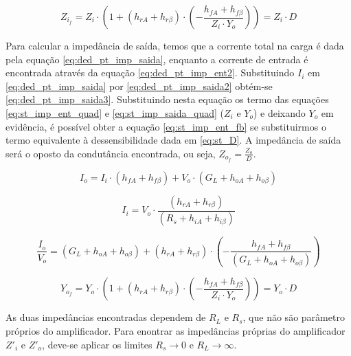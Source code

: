 \documentclass[openright]{normas-utf-tex} %
\begin{document}
\begin{equation}\label{eq:st_imp_ent_fb}
Z_{i_f} = Z_i \cdot \left( 1 + \left(h_{rA} + h_{r\beta}\right) \cdot \left(-\frac{h_{fA} + h_{f\beta}} {Z_i \cdot Y_o} \right) \right) = Z_i \cdot D
\end{equation}

Para calcular a impedância de saída, temos que a corrente total na carga é dada pela equação \ref{eq:ded_pt_imp_saida}, enquanto a corrente de entrada é encontrada através da equação \ref{eq:ded_pt_imp_ent2}. Substituindo $I_i$ em \ref{eq:ded_pt_imp_saida} por \ref{eq:ded_pt_imp_saida2} obtém-se \ref{eq:ded_pt_imp_saida3}. Substituindo nesta equação os termo das equações \ref{eq:st_imp_ent_quad} e \ref{eq:st_imp_saida_quad} ($Z_i$ e $Y_o$) e deixando $Y_o$ em evidência, é possível obter a equação \ref{eq:st_imp_ent_fb} se substituirmos o termo equivalente à dessensibilidade dada em \ref{eq:st_D}. A impedância de saída será o oposto da condutância encontrada, ou seja, $Z_{o_f} = \frac{Z_o}{D}$. \cite{pedroni,millman}

\begin{equation}\label{eq:ded_pt_imp_saida}
I_{o} = I_i \cdot \left( h_{fA} + h_{f\beta} \right) + V_o \cdot \left(G_L + h_{oA} + h_{o\beta} \right)
\end{equation}

\begin{equation}\label{eq:ded_pt_imp_saida2}
I_{i} =  V_o \cdot \frac{\left(h_{rA} + h_{r\beta}\right)}{\left( R_s + h_{iA} + h_{i\beta} \right)}
\end{equation}

\begin{equation}\label{eq:ded_pt_imp_saida3}
\frac{I_o}{V_o} = \left( G_L + h_{oA} + h_{o\beta} \right) + \left(h_{rA} + h_{r\beta}\right) \cdot \left(-\frac{h_{fA} + h_{f\beta}} {\left( G_L + h_{oA} + h_{o\beta} \right)} \right)
\end{equation}

\begin{equation}\label{eq:st_imp_saida_fb}
Y_{o_f} = Y_o \cdot \left( 1 + \left(h_{rA} + h_{r\beta}\right) \cdot \left(-\frac{h_{fA} + h_{f\beta}} {Z_i \cdot Y_o} \right) \right) = Y_o \cdot D
\end{equation}

As duas impedâncias encontradas dependem de $R_L$ e $R_s$, que não são parâmetro próprios do amplificador. Para enontrar as impedâncias próprias do amplificador $Z'_i$ e $Z'_o$, deve-se aplicar os limites $R_s \rightarrow 0$ e $R_L \rightarrow \infty$. \cite{pedroni}
\end{document}

